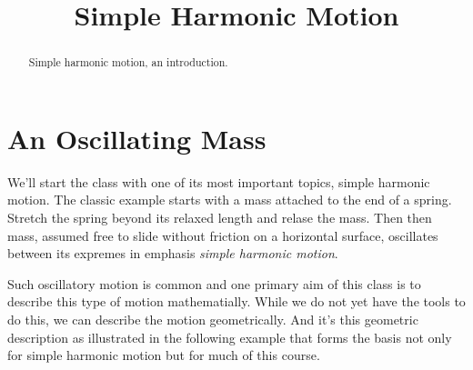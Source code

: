 \documentclass{ximera}
\title{Simple Harmonic Motion}
\begin{document}
\begin{abstract}
Simple harmonic motion, an introduction.
\end{abstract}
\maketitle

\section{An Oscillating Mass}

We'll start the class with one of its most important topics, simple harmonic motion. The classic example starts with a mass attached to the end of a spring. Stretch the spring beyond its relaxed length and relase the mass. Then then mass, assumed free to slide without friction on a horizontal surface, oscillates between its expremes in emphasis \emph{simple harmonic motion}.

Such oscillatory motion is common and one primary aim of this class is to describe this type of motion mathematially. While we do not yet have the tools to do this, we can describe the motion geometrically. And it's this geometric description as illustrated in the following example that forms the basis not only for simple harmonic motion but for much of this course.
\end{document}
